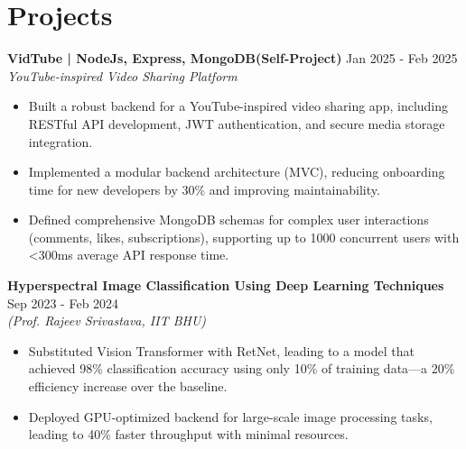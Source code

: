 \documentclass[a4paper,10pt]{article}
\begin{document}
\section*{Projects}
\textbf{VidTube | NodeJs, Express, MongoDB(Self-Project)} \hfill Jan 2025 - Feb 2025 \\
\textit{YouTube-inspired Video Sharing Platform}
\begin{itemize}[noitemsep,topsep=0pt]
    \item Built a robust backend for a YouTube-inspired video sharing app, including RESTful API development, JWT authentication, and secure media storage integration.
    \item Implemented a modular backend architecture (MVC), reducing onboarding time for new developers by 30\% and improving maintainability.
    \item Defined comprehensive MongoDB schemas for complex user interactions (comments, likes, subscriptions), supporting up to 1000 concurrent users with <300ms average API response time.
\end{itemize}
\vspace{0.05 cm}
\textbf{Hyperspectral Image Classification Using Deep Learning Techniques} \hfill Sep 2023 - Feb 2024 \\
\textit{(Prof. Rajeev Srivastava, IIT BHU)}
\begin{itemize}[noitemsep,topsep=0pt]
    \item Substituted Vision Transformer with RetNet, leading to a model that achieved 98\% classification accuracy using only 10\% of training data—a 20\% efficiency increase over the baseline.
    \item Deployed GPU-optimized backend for large-scale image processing tasks, leading to 40\% faster throughput with minimal resources.
\end{itemize}
\end{document}
